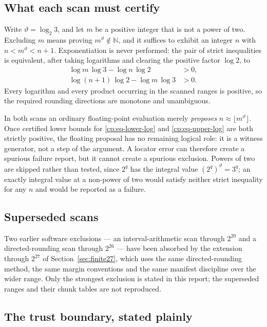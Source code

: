 \documentclass[11pt,oneside]{article}
\theoremstyle{definition}
\theoremstyle{remark}
\newcommand{\N}{\mathbb N}
\newcommand{\thetaq}{\vartheta}
\begin{document}
\subsection{What each scan must certify}
\label{cp:sub-certificate}

Write $\thetaq=\log_2 3$, and let $m$ be a positive integer that is not a power of two.
Excluding $m$ means proving $m^{\thetaq}\notin\N$, and it suffices to exhibit an integer $n$
with $n<m^{\thetaq}<n+1$.  Exponentiation is never performed: the pair of strict inequalities
is equivalent, after taking logarithms and clearing the positive factor $\log 2$, to
\begin{align}
\log m\,\log3-\log n\,\log2&>0,\label{cp:eq-lower-log}\\
\log(n+1)\,\log2-\log m\,\log3&>0.\label{cp:eq-upper-log}
\end{align}
Every logarithm and every product occurring in the scanned ranges is positive, so the
required rounding directions are monotone and unambiguous.

In both scans an ordinary floating-point evaluation merely \emph{proposes}
$n\approx\lfloor m^{\thetaq}\rfloor$.  Once certified lower bounds for
\eqref{cp:eq-lower-log} and \eqref{cp:eq-upper-log} are both strictly positive, the floating
proposal has no remaining logical role: it is a witness generator, not a step of the
argument.  A locator error can therefore create a spurious failure report, but it cannot
create a spurious exclusion.  Powers of two are skipped rather than tested, since $2^q$ has
the integral value $(2^q)^{\thetaq}=3^q$; an exactly integral value at a non-power of two
would satisfy neither strict inequality for any $n$ and would be reported as a failure.

\subsection{Superseded scans}

Two earlier software exclusions --- an interval-arithmetic scan through $2^{20}$ and a
directed-rounding scan through $2^{26}$ --- have been absorbed by the extension through
$2^{27}$ of Section~\ref{sec:finite27}, which uses the same directed-rounding
method, the same margin conventions and the same manifest discipline over the wider range.
Only the strongest exclusion is stated in this report; the superseded ranges and their
chunk tables are not reproduced.

\subsection{The trust boundary, stated plainly}
\label{cp:sub-boundary}
\end{document}
